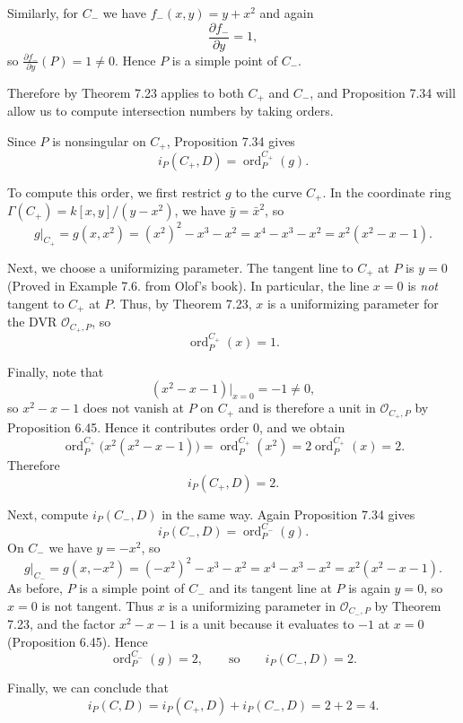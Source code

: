 \documentclass[a4paper,12pt,openany]{article}
\theoremstyle{plain}
\theoremstyle{definition}
\theoremstyle{remark}
\begin{document}
Similarly, for $C_{-}$ we have $f_{-}(x,y)=y+x^{2}$ and again
\[
\frac{\partial f_{-}}{\partial y}=1,
\]
so $\frac{\partial f_{-}}{\partial y}(P)=1\neq 0$. Hence $P$ is a simple point of $C_{-}$.

Therefore by Theorem 7.23 applies to both $C_{+}$ and $C_{-}$, and Proposition 7.34  will allow us to compute
intersection numbers by taking orders.

\medskip


Since $P$ is nonsingular on $C_{+}$, Proposition 7.34 gives
\[
i_{P}(C_{+},D)=\operatorname{ord}^{C_{+}}_{P}(g).
\]

To compute this order, we first restrict $g$ to the curve $C_{+}$.
In the coordinate ring $\Gamma(C_{+})=k[x,y]/(y-x^{2})$, we have $\bar{y}=\bar{x}^{2}$, so
\[
g|_{C_{+}} = g(x,x^{2}) = (x^{2})^{2}-x^{3}-x^{2}
= x^{4}-x^{3}-x^{2}
= x^{2}(x^{2}-x-1).
\]

Next, we choose a uniformizing parameter.
The tangent line to $C_{+}$ at $P$ is $y=0$ (Proved in Example 7.6. from Olof's book). In particular, the line $x=0$ is \emph{not} tangent to $C_{+}$ at $P$.
Thus, by Theorem 7.23, $x$ is a uniformizing parameter for the DVR $\mathcal{O}_{C_{+},P}$, so
\[
\operatorname{ord}^{C_{+}}_{P}(x)=1.
\]

Finally, note that
\[
(x^{2}-x-1)\big|_{x=0}=-1\neq 0,
\]
so $x^{2}-x-1$ does not vanish at $P$ on $C_{+}$ and is therefore a unit in $\mathcal{O}_{C_{+},P}$ by Proposition 6.45.
Hence it contributes order $0$, and we obtain
\[
\operatorname{ord}^{C_{+}}_{P}\bigl(x^{2}(x^{2}-x-1)\bigr)
=\operatorname{ord}^{C_{+}}_{P}(x^{2})
=2\operatorname{ord}^{C_{+}}_{P}(x)=2.
\]
Therefore
\[
i_{P}(C_{+},D)=2.
\]

\medskip

Next, compute $i_{P}(C_{-},D)$ in the same way.
Again Proposition 7.34 gives
\[
i_{P}(C_{-},D)=\operatorname{ord}^{C_{-}}_{P}(g).
\]
On $C_{-}$ we have $y=-x^{2}$, so
\[
g|_{C_{-}} = g(x,-x^{2}) = (-x^{2})^{2}-x^{3}-x^{2}
= x^{4}-x^{3}-x^{2}
= x^{2}(x^{2}-x-1).
\]
As before, $P$ is a simple point of $C_{-}$ and its tangent line at $P$ is again $y=0$, so $x=0$ is not tangent.
Thus $x$ is a uniformizing parameter in $\mathcal{O}_{C_{-},P}$ by Theorem 7.23, and the factor
$x^{2}-x-1$ is a unit because it evaluates to $-1$ at $x=0$ (Proposition 6.45). Hence
\[
\operatorname{ord}^{C_{-}}_{P}(g)=2,
\qquad\text{so}\qquad
i_{P}(C_{-},D)=2.
\]

\medskip

Finally, we can conclude that
\[
i_{P}(C,D)=i_{P}(C_{+},D)+i_{P}(C_{-},D)=2+2=4.
\]
\end{document}
